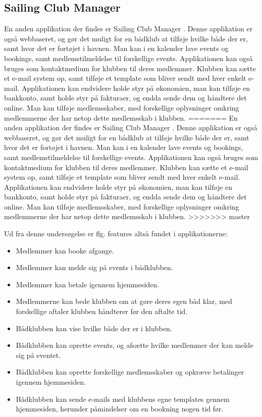 \subsection*{Sailing Club Manager}
En anden applikation der findes er Sailing Club Manager \citep{SailClub}. 
Denne applikation er også webbaseret, og gør det muligt for en bådklub at tilføje hvilke både der er, samt hvor det er fortøjet i havnen.
Man kan i en kalender lave events og bookings, samt medlemstilmeldelse til forskellige events. 
Applikationen kan også bruges som kontaktmedium for klubben til deres medlemmer. 
Klubben kan sætte et e-mail system op, samt tilføje et template som bliver sendt med hver enkelt e-mail. 
Applikationen kan endvidere holde styr på økonomien, man kan tilføje en bankkonto, samt  holde styr på fakturaer, og endda sende dem og håndtere det online. 
Man kan tilføje medlemsskaber, med forskellige oplysninger omkring medlemmerne der har netop dette medlemsskab i klubben.
=======
En anden applikation der findes er Sailing Club Manager \citep{SailClub}. Denne applikation er også
webbaseret, og gør det muligt for en bådklub at tilføje hvilke både der er, samt hvor det er fortøjet i
havnen. Man kan i en kalender lave events og bookings, samt medlemstilmeldelse til forskellige events. Applikationen kan også bruges som kontaktmedium for klubben til deres medlemmer. Klubben kan sætte et
e-mail system op, samt tilføje et template som bliver sendt med hver enkelt e-mail. Applikationen kan endvidere
holde styr på økonomien, man kan tilføje en bankkonto, samt  holde styr på fakturaer, og endda sende
dem og håndtere det online. Man kan tilføje medlemsskaber, med forskellige oplysninger omkring medlemmerne der
har netop dette medlemsskab i klubben.
>>>>>>> master

Ud fra denne undersøgelse er flg. features altså fundet i applikationerne:

\begin{itemize}
	\item Medlemmer kan booke afgange.
	\item Medlemmer kan melde sig på events i bådklubben.
	\item Medlemmer kan betale igennem hjemmesiden.
	\item Medlemmerne kan bede klubben om at gøre deres egen båd klar, med forskellige aftaler klubben håndterer
        før den aftalte tid.
	\item Bådklubben kan vise hvilke både der er i klubben.
	\item Bådklubben kan oprette events, og afsætte hvilke medlemmer der kan melde sig på eventet.
	\item Bådklubben kan oprette forskellige medlemsskaber og opkræve betalinger igennem hjemmesiden.
	\item Bådklubben kan sende e-mails med klubbens egne templates gennem hjemmesiden, herunder påmindelser om en
        bookning nogen tid før.
\end{itemize}

